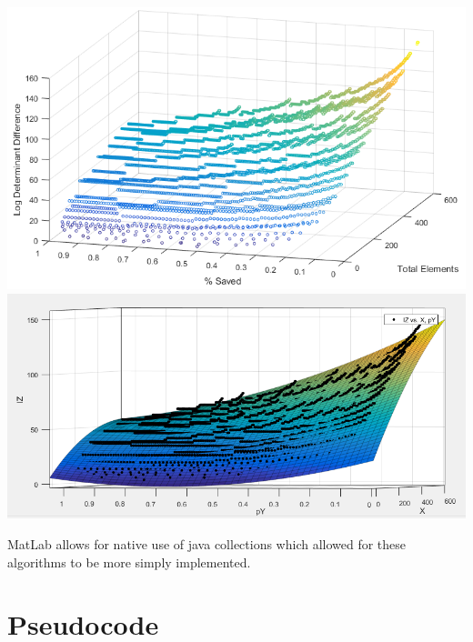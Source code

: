 \documentclass[11pt]{article}
\begin{document}
\includegraphics[width=\textwidth]{plot}
\includegraphics[width=\textwidth]{fit}

\clearpage
\appendix
MatLab allows for native use of java collections which allowed for these algorithms to be more simply implemented. 
\section{Pseudocode}


\end{document}
